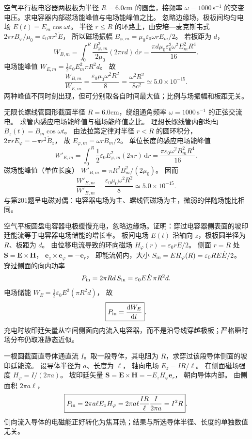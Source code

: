 空气平行板电容器两极板为半径 $R=6.0$cm 的圆盘，接频率 $\omega=1000\,\mathrm{s^{-1}}$ 的交变电压。求电容器内部磁场能峰值与电场能峰值之比。
\exsolution
忽略边缘场，极板间均匀电场
$E(t)=E_m\cos\omega t$。
半径 $r\le R$ 的环路上，由安培—麦克斯韦式
$2\pi rB_\varphi/\mu_0=
\varepsilon_0\pi r^2\dot E$，
所以磁场振幅
$B_{\varphi,m}=\mu_0\varepsilon_0\omega rE_m/2$。
若板距为 $d$，
\[
W_{B,m}=\int_0^R\frac{B_{\varphi,m}^2}{2\mu_0}
(2\pi rd)\,\mathrm dr
=\frac{\pi d\mu_0\varepsilon_0^2\omega^2E_m^2R^4}{16}.
\]
电场能峰值
$W_{E,m}=\frac12\varepsilon_0E_m^2\pi R^2d$。
故
\[
\boxed{\frac{W_{B,m}}{W_{E,m}}
=\frac{\varepsilon_0\mu_0\omega^2R^2}{8}
=\frac{\omega^2R^2}{8c^2}
\simeq5.0\times10^{-15}}.
\]
\excheck 两种峰值不同时刻出现，但可分别取各自时间最大值；比例与场振幅和板距无关。

无限长螺线管圆形截面半径
$R=6.0$cm，绕组通角频率
$\omega=1000\,\mathrm{s^{-1}}$ 的正弦交流电。
求管内感应电场能峰值与磁场能峰值之比。
\exsolution
理想长螺线管内部均匀
$B_z(t)=B_m\cos\omega t$。
由法拉第定律对半径 $r<R$ 的圆环积分，
$2\pi rE_\varphi=-\pi r^2\dot B_z$，
故
$E_{\varphi,m}=\omega rB_m/2$。
单位长度的感应电场能峰值
\[
W'_{E,m}=\int_0^R\frac12\varepsilon_0E_{\varphi,m}^2(2\pi r)\,\mathrm dr
=\frac{\pi\varepsilon_0\omega^2B_m^2R^4}{16}.
\]
磁场能峰值（单位长度）
$W'_{B,m}=\pi R^2B_m^2/(2\mu_0)$。
因而
\[
\boxed{\frac{W'_{E,m}}{W'_{B,m}}
=\frac{\varepsilon_0\mu_0\omega^2R^2}{8}
\simeq5.0\times10^{-15}}.
\]
\excheck 与第201题呈电磁对偶：电容器电场为主、螺线管磁场为主，微弱的伴随场能比相同。

空气平板圆盘电容器电极缓慢充电，忽略边缘场。证明：穿过电容器侧表面的坡印廷能流等于电容器电场储能的增长率。
\exsolution
板间电场 $E(t)$ 沿轴向 $z$，极板圆半径为 $R$、板距为 $d$。
由位移电流导致的环向磁场
$H_\varphi(r)=\varepsilon_0r\dot E/2$。
侧面 $r=R$ 处
$\bm S=\bm E\times\bm H$，
$\bm e_z\times\bm e_\varphi=-\bm e_r$，
即能流朝内，大小
$S_{\rm in}=EH_\varphi(R)=\varepsilon_0R E\dot E/2$。
穿过侧面的向内功率
\[
P_{\rm in}=2\pi Rd\,S_{\rm in}
=\varepsilon_0E\dot E\,\pi R^2d.
\]
电场储能
$W_E=\frac12\varepsilon_0E^2(\pi R^2d)$，
故
\[
\boxed{P_{\rm in}=\frac{\mathrm dW_E}{\mathrm dt}}.
\]
\excheck 充电时坡印廷矢量从空间侧面向内流入电容器，而不是沿导线穿越极板；严格瞬时场分布仍取准静态近似。

一根圆截面直导体通直流 $I$。取一段导体，其电阻为 $R$，求穿过该段导体侧面的坡印廷能流。
\exsolution
设导体半径为 $a$、长度为 $\ell$，
轴向电场
$E_z=IR/\ell$。
在侧面磁场强度
$H_\varphi=I/(2\pi a)$。
坡印廷矢量
$\bm S=\bm E\times\bm H
=-E_zH_\varphi\bm e_r$，
朝向导体内部。
由侧面积 $2\pi a\ell$，
\[
\boxed{P_{\rm in}=2\pi a\ell E_zH_\varphi
=2\pi a\ell\frac{IR}{\ell}\frac{I}{2\pi a}
=I^2R}.
\]
\excheck 侧向流入导体的电磁能正好转化为焦耳热；结果与所选导体半径、长度的单独数值无关。

